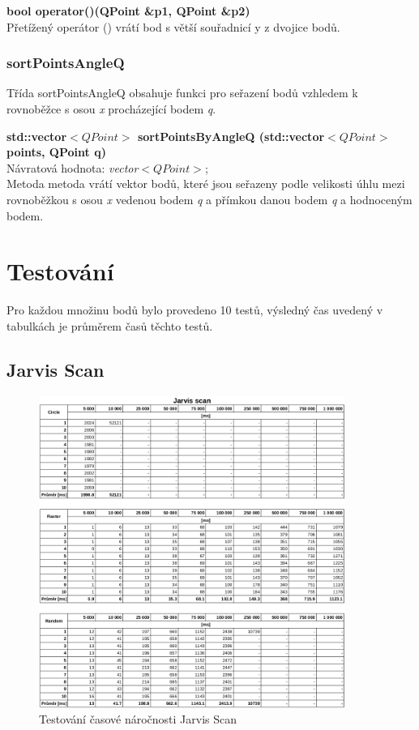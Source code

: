 \documentclass[a4paper, 12pt]{article}
\begin{document}
\textbf{bool operator()(QPoint \&p1, QPoint \&p2)}\\
Přetížený operátor () vrátí bod s větší souřadnicí y z dvojice bodů.
\\

\subsubsection{sortPointsAngleQ}
Třída sortPointsAngleQ obsahuje funkci pro seřazení bodů vzhledem k rovnoběžce s osou \textit{x} procházející bodem \textit{q}.

\textbf{std::vector$<QPoint>$ sortPointsByAngleQ (std::vector$<QPoint>$ points, QPoint q)}\\
Návratová hodnota: \textit{vector$<QPoint>$};\\
Metoda metoda vrátí vektor bodů, které jsou seřazeny podle velikosti úhlu mezi rovnoběžkou s osou \textit{x} vedenou bodem \textit{q} a přímkou danou bodem \textit{q} a hodnoceným bodem.

\newpage
\section{Testování}
Pro každou množinu bodů bylo provedeno 10 testů, výsledný čas uvedený v tabulkách je průměrem časů těchto testů.

\subsection{Jarvis Scan}

\begin{figure}[h!]
	\centering
	\includegraphics[width=10cm]{data_jarvis_scan.png}
	\caption{Testování časové náročnosti Jarvis Scan}
\end{figure}
\end{document}
